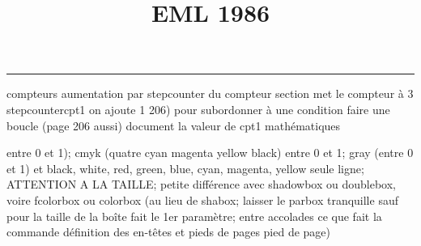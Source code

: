 \documentclass[11pt]{article}%
\title{\bf \vspace{-2cm} EML 1986} %
\author{} %
\date{} %
\renewcommand{\headrulewidth}{0pt}%
\renewcommand{\footrulewidth}{0.4pt}%
\begin{document}
\maketitle %
\vspace{-1.4cm}\hrule %
\thispagestyle{fancy}

\vspace*{.2cm}



compteurs%
aumentation par stepcounter du compteur section%
met le compteur à 3%
stepcounter{cpt1} on ajoute 1%
206) pour subordonner à une condition %
faire une boucle (page 206 aussi) %
document la valeur de cpt1 
mathématiques\newcommand{\ch}{\operatorname{ch}} 
\newcommand{\sh}{\operatorname{sh}}
\renewcommand{\tanh}{\operatorname{th}}
\renewcommand{\sinh}{\operatorname{sh}}
\renewcommand{\cosh}{\operatorname{ch}}
\newcommand{\argsh}{\operatorname{argsh}}
\newcommand{\argch}{\operatorname{argch}}
\newcommand{\argth}{\operatorname{argth}}
\newcommand{\ker}{\operatorname{Ker}}
\renewcommand{\im}{\operatorname{Im}}
\newcommand{\rg}{\operatorname{rg}}
\newcommand{\Id}{\operatorname{Id}}
\newcommand{\id}{\operatorname{id}}
\renewcommand{\leq}{\leq}
\renewcommand{\geq}{\geq }

entre 0 et 1); cmyk (quatre cyan magenta yellow black) entre 0 et 1;
gray (entre 0 et 1) et black, white, red, green, blue, cyan, magenta,
yellow%
seule ligne; ATTENTION A LA TAILLE; petite différence avec shadowbox ou
doublebox, voire fcolorbox ou colorbox (au lieu de shabox; laisser le
parbox tranquille sauf pour la taille de la boîte
\newcommand{\Tbox}[1]{\begin{center} \shabox{\parbox{0.6
\linewidth}{#1}} \end{center}} %
fait le 1er paramètre; entre accolades ce que fait la commande
définition des en-têtes et pieds de pages\pagestyle{fancy}
\chead{}
\rfoot[ \ \thepage]{\thepage}
\cfoot{}
\lfoot{}
\thispagestyle{fancy} %
pied de page)\renewcommand{\footrulewidth}{0.4pt}
\renewcommand{\headrulewidth}{0.4pt}
\end{document}
